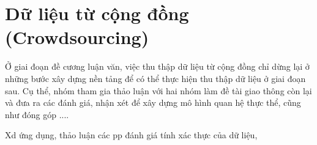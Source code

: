 \section{Dữ liệu từ cộng đồng (Crowdsourcing)}
Ở giai đoạn đề cương luận văn, việc thu thập dữ liệu từ cộng đồng chỉ dừng lại ở những bước xây dựng nền tảng để có thể thực hiện thu thập dữ liệu ở giai đoạn sau. Cụ thể, nhóm tham gia thảo luận với hai nhóm làm đề tài giao thông còn lại và đưa ra các đánh giá, nhận xét để xây dựng mô hình quan hệ thực thể, cũng như đóng góp ....


Xd ứng dụng, thảo luận các pp đánh giá tính xác thực của dữ liệu,

